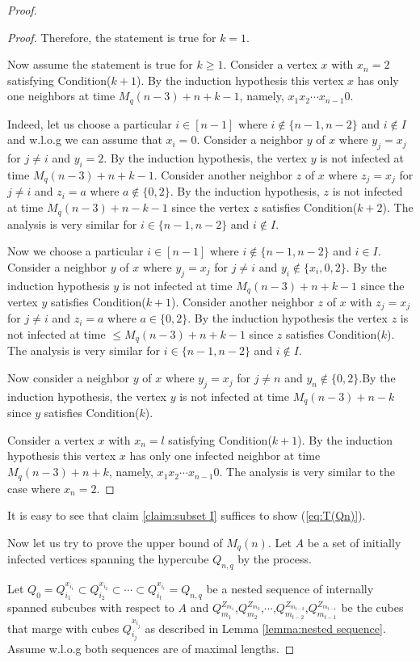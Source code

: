 \documentclass[reqno,11pt]{amsart}
\renewcommand{\leq}{\leqslant}
\renewcommand{\geq}{\geqslant}
\begin{document}
\begin{proof}
\begin{proof}
Therefore, the statement is true for $k=1$.

Now assume the statement is true for $k \geq 1$. Consider a vertex $x$ with $x_n=2$ satisfying Condition($k+1$). By the induction hypothesis this vertex $x$ has only one neighbors at time $M_q(n-3)+n+k-1$, namely, $x_1x_2\cdots x_{n-1}0$. 

Indeed, let us choose a particular $i \in [n-1]$ where $i \notin \{n-1,n-2\}$ and $i \notin I$ and w.l.o.g we can assume that $x_i=0$. Consider a neighbor $y$ of $x$ where $y_j=x_j$ for $j \neq i$ and $y_i=2$. By the induction hypothesis, the vertex $y$ is not infected at time $M_q(n-3)+n+k-1$. Consider another neighbor $z$ of $x$ where $z_j=x_j$ for $j \neq i$ and $z_i=a$ where $a \notin \{0,2\}$. By the induction hypothesis, $z$ is not infected at time $M_q(n-3)+n-k-1$ since the vertex $z$ satisfies Condition($k+2$). The analysis is very similar for $i \in \{n-1,n-2\}$ and $i \notin I$.  

Now we choose a particular $i \in [n-1]$ where $i \notin \{n-1,n-2\}$ and $i \in I$. Consider a neighbor $y$ of $x$ where $y_j=x_j$ for $j \neq i$ and $y_i \notin \{x_i,0,2\}$. By the induction hypothesis $y$ is not infected at time $M_q(n-3)+n+k-1$ since the vertex $y$ satisfies Condition($k+1$). Consider another neighbor $z$ of $x$ with $z_j=x_j$ for $j \neq i$ and $z_i=a$ where $a \in \{0,2\}$. By the induction hypothesis the vertex $z$ is not infected at time $\leq M_q(n-3)+n+k-1$ since $z$ satisfies Condition($k$). The analysis is very similar for $i \in \{n-1,n-2\}$ and $i \notin I$.

Now consider a neighbor $y$ of $x$ where $y_j=x_j$ for $j \neq n$ and $y_n \notin \{0,2\}$.By the induction hypothesis, the vertex $y$ is not infected at time $M_q(n-3)+n-k$ since $y$ satisfies Condition($k$). 

Consider a vertex $x$ with $x_n=l$ satisfying Condition($k+1$). By the induction hypothesis this vertex $x$ has only one infected neighbor at time $M_q(n-3)+n+k$, namely, $x_1x_2\cdots x_{n-1}0$. The analysis is very similar to the case where $x_n=2$. 
\end{proof}
It is easy to see that claim \ref{claim:subset I} suffices to show (\ref{eq:T(Qn)}).

\vspace{5mm}
Now let us try to prove the upper bound of $M_{q}(n)$. Let $A$ be a set of initially infected vertices spanning the hypercube $Q_{n,q}$ by the process. 

Let  $Q_0=Q_{i_1}^{x_{i_1}} \subset Q_{i_2}^{x_{i_2}} \subset \cdots \subset Q_{i_t}^{x_{i_t}}=Q_{n,q}$ be a nested sequence of internally spanned subcubes with respect to $A$ and $Q_{m_1}^{Z_{m_1}}$,$Q_{m_2}^{Z_{m_2}}$,$\cdots$,$Q_{m_{t-2}}^{Z_{m_{t-2}}}$,$Q_{m_{t-1}}^{Z_{m_{t-1}}}$ be the cubes that marge with cubes $Q_{i_j}^{x_{i_j}}$ as described in Lemma \ref{lemma:nested sequence}. Assume w.l.o.g both sequences are of maximal lengths. 


\end{proof}
\end{document}
